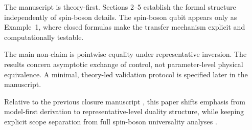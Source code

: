 The manuscript is theory-first. Sections 2--5 establish the formal structure independently of
spin-boson details. The spin-boson qubit appears only as Example~1, where closed formulas make the transfer
mechanism explicit and computationally testable.

The main non-claim is pointwise equality under representative inversion. The results concern
asymptotic exchange of control, not parameter-level physical equivalence. A minimal, theory-led
validation protocol is specified later in the manuscript.

Relative to the previous closure manuscript
\cite{mccaulMeanForceHamiltoniansInfluence2026}, this paper shifts emphasis from model-first
derivation to representative-level duality structure, while keeping explicit scope separation from
full spin-boson universality analyses
\cite{leggettDynamicsDissipativeTwostate1987,weissQuantumDissipativeSystems2012,bullaQuantumPhaseTransitionSubohmic2003,winterQuantumPhaseTransitionSubohmic2009}.

